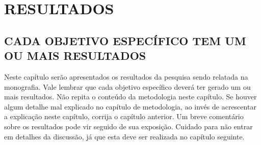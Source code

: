 \chapter{RESULTADOS}
\section{CADA OBJETIVO ESPECÍFICO TEM UM OU MAIS RESULTADOS}
Neste capítulo serão apresentados os resultados da pesquisa sendo relatada na monografia. Vale lembrar que cada objetivo específico deverá ter gerado um ou mais resultados.
Não repita o conteúdo da metodologia neste capítulo. Se houver algum detalhe mal explicado no capítulo de metodologia, ao invés de acrescentar a explicação neste capítulo, corrija o capítulo anterior.
Um breve comentário sobre os resultados pode vir seguido de sua exposição. Cuidado para não entrar em detalhes da discussão, já que esta deve ser realizada no capítulo seguinte.
